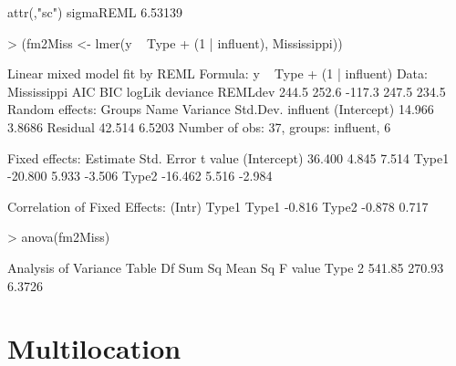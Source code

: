 \documentclass[12pt]{article}
\begin{document}
\begin{Schunk}
\begin{Soutput}
attr(,"sc")
sigmaREML 
  6.53139 
\end{Soutput}
\begin{Sinput}
> (fm2Miss <- lmer(y ~ Type + (1 | influent), Mississippi))
\end{Sinput}
\begin{Soutput}
Linear mixed model fit by REML 
Formula: y ~ Type + (1 | influent) 
   Data: Mississippi 
   AIC   BIC logLik deviance REMLdev
 244.5 252.6 -117.3    247.5   234.5
Random effects:
 Groups   Name        Variance Std.Dev.
 influent (Intercept) 14.966   3.8686  
 Residual             42.514   6.5203  
Number of obs: 37, groups: influent, 6

Fixed effects:
            Estimate Std. Error t value
(Intercept)   36.400      4.845   7.514
Type1        -20.800      5.933  -3.506
Type2        -16.462      5.516  -2.984

Correlation of Fixed Effects:
      (Intr) Type1 
Type1 -0.816       
Type2 -0.878  0.717
\end{Soutput}
\begin{Sinput}
> anova(fm2Miss)
\end{Sinput}
\begin{Soutput}
Analysis of Variance Table
     Df Sum Sq Mean Sq F value
Type  2 541.85  270.93  6.3726
\end{Soutput}
\end{Schunk}

\section{Multilocation}
\label{sec:Multilocation}
\end{document}
